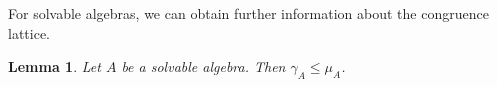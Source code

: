 \documentclass[a4paper, english, 9pt]{amsart}
\theoremstyle{plain}
\newtheorem{lemma}[theorem]{Lemma}
\theoremstyle{definition}
\def\comment#1{{\color{red} #1}}
\begin{document}






For solvable algebras, we can obtain further information about the congruence lattice.
\begin{lemma}\label{gamma and max} Let $A$ be a solvable algebra. Then $\gamma_A\leq \mu_A$.
\end{lemma}
\end{document}
